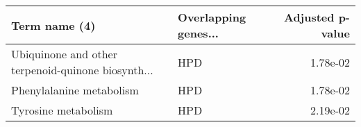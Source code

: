 \begin{tabular}{llr}
\toprule
                                     Term name (4) & Overlapping genes... &  Adjusted p-value \\
\midrule
Ubiquinone and other terpenoid-quinone biosynth... &                  HPD &          1.78e-02 \\
                          Phenylalanine metabolism &                  HPD &          1.78e-02 \\
                               Tyrosine metabolism &                  HPD &          2.19e-02 \\
\bottomrule
\end{tabular}
